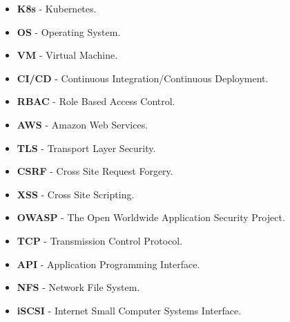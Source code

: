 \begin{itemize}
    \setlength\itemsep{1px}
    \item \textbf{K8s} - Kubernetes.
    \item \textbf{OS} - Operating System.
    \item \textbf{VM} - Virtual Machine.
    \item \textbf{CI/CD} - Continuous Integration/Continuous Deployment.
    \item \textbf{RBAC} - Role Based Access Control.
    \item \textbf{AWS} - Amazon Web Services.
    \item \textbf{TLS} - Transport Layer Security.
    \item \textbf{CSRF} - Cross Site Request Forgery.
    \item \textbf{XSS} - Cross Site Scripting.
    \item \textbf{OWASP} - The Open Worldwide Application Security Project.
    \item \textbf{TCP} - Transmission Control Protocol.
    \item \textbf{API} - Application Programming Interface.
    \item \textbf{NFS} - Network File System.
    \item \textbf{iSCSI} - Internet Small Computer Systems Interface.
\end{itemize}




